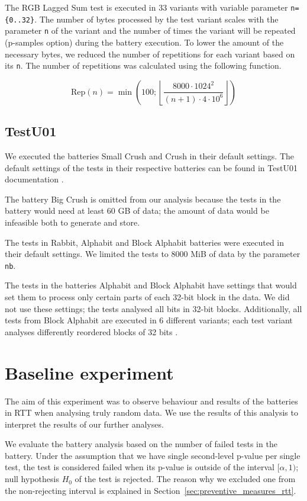 \documentclass[
	digital,    %
	oneside,    %
	color,
	11pt,
	nocover,
	notable,
	nolof,
	nolot,
]{fithesis3}
\theoremstyle{definition}
\theoremstyle{remark}
\begin{document}
The RGB Lagged Sum test is executed in 33 variants with variable parameter \texttt{n=\{0..32\}}. The number of bytes processed by the test variant scales with the parameter \texttt{n} of the variant and the number of times the variant will be repeated (p-samples option) during the battery execution. To lower the amount of the necessary bytes, we reduced the number of repetitions for each variant based on its \texttt{n}. The number of repetitions was calculated using the following function.

$$
\text{Rep}(n) = \min\left(100 ; \left\lfloor \frac{ 8000 \cdot 1024^{2} }{ (n + 1) \cdot 4 \cdot 10^{6} } \right\rfloor \right)
$$

\subsection*{TestU01}
We executed the batteries Small Crush and Crush in their default settings. The default settings of the tests in their respective batteries can be found in TestU01 documentation \cite[p.~143]{testu01-documentation}.

The battery Big Crush is omitted from our analysis because the tests in the battery would need at least 60 GB of data; the amount of data would be infeasible both to generate and store.

The tests in Rabbit, Alphabit and Block Alphabit batteries were executed in their default settings. We limited the tests to 8000 MiB of data by the parameter \texttt{nb}.

The tests in the batteries Alphabit and Block Alphabit have settings that would set them to process only certain parts of each 32-bit block in the data. We did not use these settings; the tests analysed all bits in 32-bit blocks. Additionally, all tests from Block Alphabit are executed in 6 different variants; each test variant analyses differently reordered blocks of 32 bits \cite[p.~155]{testu01-documentation}.

\section{Baseline experiment}
\label{sec:baseline_exp}
The aim of this experiment was to observe behaviour and results of the batteries in RTT when analysing truly random data.  We use the results of this analysis to interpret the results of our further analyses.

We evaluate the battery analysis based on the number of failed tests in the battery. Under the assumption that we have single second-level p-value per single test, the test is considered failed when its p-value is outside of the interval $[\alpha, 1)$; null hypothesis $H_0$ of the test is rejected. The reason why we excluded one from the non-rejecting interval is explained in Section~\ref{sec:preventive_measures_rtt}.
\end{document}
